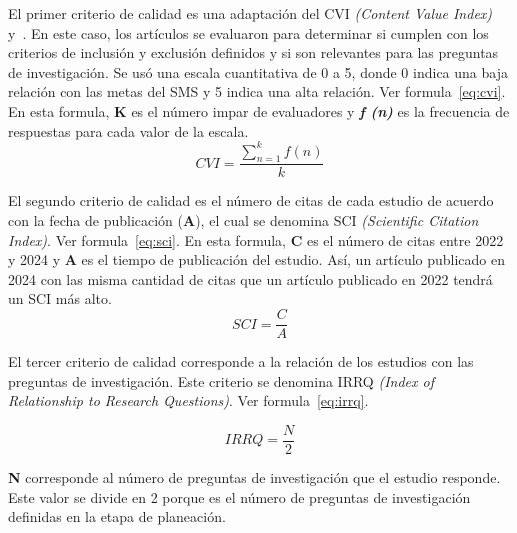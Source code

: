 El primer criterio de calidad es una adaptación del CVI \textit{(Content Value Index)}~\cite{almanasreh2019evaluation} y~\cite{yaghmaei2003content}.
En este caso, los artículos se evaluaron para determinar si cumplen con los criterios de inclusión y exclusión definidos y si son relevantes para las preguntas de investigación. Se usó una escala cuantitativa de 0 a 5, donde 0 indica una baja relación con las metas del SMS y 5 indica una alta relación.
Ver formula~\ref{eq:cvi}. En esta formula, \textbf{K} es el número impar de evaluadores y \textbf{\textit{f (n)}} es la frecuencia de respuestas para cada valor de la escala.\\

\begin{equation}
\label{eq:cvi}
CVI = \frac{\sum_{n=1}^{k} f(n)}{k}
\end{equation}

El segundo criterio de calidad es el número de citas de cada estudio de acuerdo con la fecha de publicación (\textbf{A}), el cual se denomina SCI \textit{(Scientific Citation Index)}. Ver formula~\ref{eq:sci}. En esta formula, \textbf{C} es el número de citas entre 2022 y 2024 y \textbf{A} es el tiempo de publicación del estudio. Así, un artículo publicado en 2024 con las misma cantidad de citas que un artículo publicado en 2022 tendrá un SCI más alto.\\

\begin{equation}
\label{eq:sci}
SCI = \frac{C}{A}
\end{equation}

El tercer criterio de calidad corresponde a la relación de los estudios con las preguntas de investigación. Este criterio se denomina IRRQ \textit{(Index of Relationship to Research Questions)}. Ver formula~\ref{eq:irrq}.

\begin{equation}
\label{eq:irrq}
IRRQ = \frac{N}{2}
\end{equation}

\textbf{N} corresponde al número de preguntas de investigación que el estudio responde. Este valor se divide en 2 porque es el número de preguntas de investigación definidas en la etapa de planeación.\\